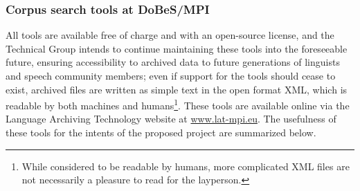 \documentclass[a4paper,12pt]{article}
\begin{document}
\subsubsection{Corpus search tools at DoBeS/MPI}\label{dobesTools}
All tools are available free of charge and with an open-source license, and the Technical Group intends to continue maintaining these tools into the foreseeable future, ensuring accessibility to archived data to future generations of linguists and speech community members; even if support for the tools should cease to exist, archived files are written as simple text in the open format XML, which is readable by both machines and humans\footnote{While considered to be readable by humans, more complicated XML files are not necessarily a pleasure to read for the layperson.}. These tools are available online via the Language Archiving Technology website at \url{www.lat-mpi.eu}. The usefulness of these tools for the intents of the proposed project are summarized below.
\end{document}
